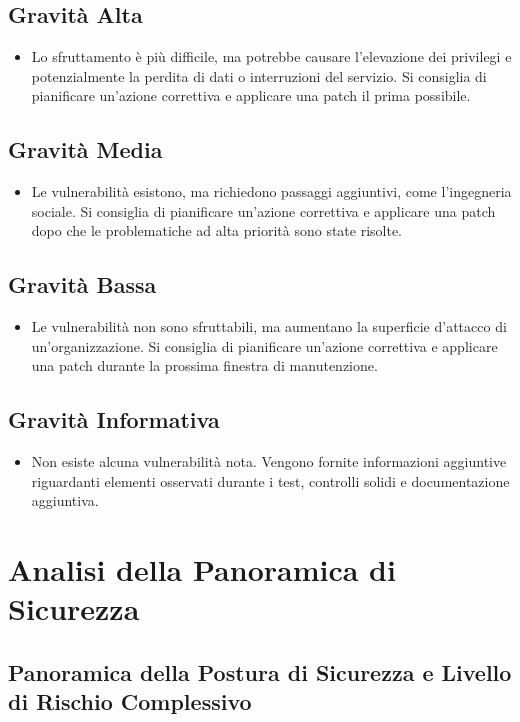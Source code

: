 \section{Gravità Alta}
\begin{itemize}
\item Lo sfruttamento è più difficile, ma potrebbe causare l'elevazione dei privilegi e potenzialmente la perdita di dati o interruzioni del servizio. Si consiglia di pianificare un'azione correttiva e applicare una patch il prima possibile.
\end{itemize}
\section{Gravità Media}
\begin{itemize}
\item Le vulnerabilità esistono, ma richiedono passaggi aggiuntivi, come l'ingegneria sociale. Si consiglia di pianificare un'azione correttiva e applicare una patch dopo che le problematiche ad alta priorità sono state risolte.
\end{itemize}
\section{Gravità Bassa}
\begin{itemize}
\item Le vulnerabilità non sono sfruttabili, ma aumentano la superficie d'attacco di un'organizzazione. Si consiglia di pianificare un'azione correttiva e applicare una patch durante la prossima finestra di manutenzione.
\end{itemize}
\section{Gravità Informativa}
\begin{itemize}
\item Non esiste alcuna vulnerabilità nota. Vengono fornite informazioni aggiuntive riguardanti elementi osservati durante i test, controlli solidi e documentazione aggiuntiva.
\end{itemize}

\chapter{Analisi della Panoramica di Sicurezza}

\section{Panoramica della Postura di Sicurezza e Livello di Rischio Complessivo}

